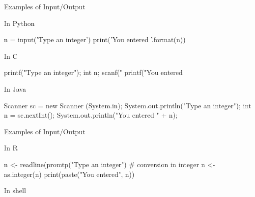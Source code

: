 \documentclass{beamer}
\begin{document}
\begin{frame}[fragile]{Examples of Input/Output}
  
  \begin{code}{In Python}
    \begin{Python}
n = input('Type an integer\n')
print('You entered {}\n'.format(n))
    \end{Python}
  \end{code}
  
  \begin{code}{In C}
    \begin{C}
printf("Type an integer\n");
int n;
scanf("%
printf("You entered %
    \end{C}
  \end{code}
  
  \begin{code}{In Java}
    \begin{Java}
Scanner sc = new Scanner (System.in);
System.out.println("Type an integer");
int n = sc.nextInt();
System.out.println("You entered " + n);
    \end{Java}
  \end{code}
  
\end{frame}

\begin{frame}[fragile]{Examples of Input/Output}
  
  \begin{code}{In R}
    \begin{R}
n <- readline(promtp("Type an integer")
# conversion in integer
n <- as.integer(n)
print(paste("You entered", n))
    \end{R}
  \end{code}
  
  \begin{code}{In shell}
  \end{code}
  
\end{frame}
\end{document}
